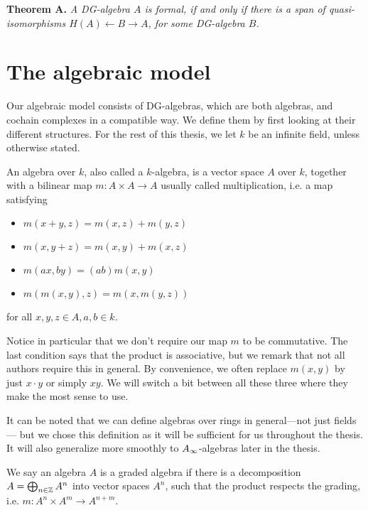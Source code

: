 \textbf{Theorem A. } \textit{A DG-algebra $A$ is formal, if and only if there is	a span of quasi-isomorphisms $H(A)\leftarrow B	\rightarrow A$, for some DG-algebra $B$.}


\section{The algebraic model}

Our algebraic model consists of DG-algebras, which are both algebras, and cochain complexes in a compatible way. We define them by first looking at their different structures. For the rest of this thesis, we let $k$ be an infinite field, unless otherwise stated.  

\begin{definition}[Algebra]
An algebra over $k$, also called a $k$-algebra, is a vector space $A$ over $k$, together with a bilinear map $m: A\times A\rightarrow A$ usually called multiplication, i.e. a map satisfying 
\begin{itemize}
    \item $m(x+y, z) = m(x, z) + m(y, z)$
    \item $m(x, y+z) = m(x, y) + m(x, z)$
    \item $m(ax, by) = (ab)m(x, y)$
    \item $m(m(x, y), z) = m(x, m(y, z))$
\end{itemize}
for all $x, y , z \in A, a, b\in k$. 
\end{definition}

Notice in particular that we don't require our map $m$ to be commutative. The last condition says that the product is associative, but we remark that not all authors require this in general. By convenience, we often replace $m(x, y)$ by just $x\cdot y$ or simply $xy$. We will switch a bit between all these three where they make the most sense to use. 

It can be noted that we can define algebras over rings in general---not just fields--- but we chose this definition as it will be sufficient for us throughout the thesis. It will also generalize more smoothly to $A_{\infty}$-algebras later in the thesis. 

\begin{definition}
We say an algebra $A$ is a graded algebra if there is a decomposition $A = \bigoplus_{n\in \mathbb{Z}}A^n$ into vector spaces $A^n$, such that the product respects the grading, i.e. $m:A^n\times A^m \rightarrow A^{n+m}$. 
\end{definition}

